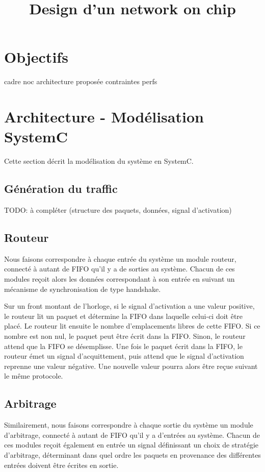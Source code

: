 \documentclass[11pt]{article}
\title{Design d'un network on chip}
\begin{document}
\maketitle

\section{Objectifs}
	cadre noc
	architecture proposée
	contraintes perfs

\section{Architecture - Modélisation SystemC}

Cette section décrit la modélisation du système en SystemC.

\subsection{Génération du traffic}
TODO: à compléter (structure des paquets, données, signal d'activation)

\subsection{Routeur}
Nous faisons correspondre à chaque entrée du système un module routeur, connecté à autant de FIFO qu'il y a de sorties au système.
Chacun de ces modules reçoit alors les données correspondant à son entrée en suivant un mécanisme de synchronisation
de type handshake.

Sur un front montant de l'horloge, si le signal d'activation a une valeur positive,
le routeur lit un paquet et détermine la FIFO dans laquelle celui-ci doit être placé.
Le routeur lit ensuite le nombre d'emplacements libres de cette FIFO.
Si ce nombre est non nul, le paquet peut être écrit dans la FIFO.
Sinon, le routeur attend que la FIFO se désemplisse.
Une fois le paquet écrit dans la FIFO, le routeur émet un signal d'acquittement,
puis attend que le signal d'activation reprenne une valeur négative.
Une nouvelle valeur pourra alors être reçue suivant le même protocole.

\subsection{Arbitrage}
Similairement, nous faisons correspondre à chaque sortie du système un module d'arbitrage, connecté à autant de FIFO qu'il y a d'entrées au système.
Chacun de ces modules reçoit également en entrée un signal définissant un choix de stratégie d'arbitrage, déterminant dans quel ordre
les paquets en provenance des différentes entrées doivent être écrites en sortie.
\end{document}

